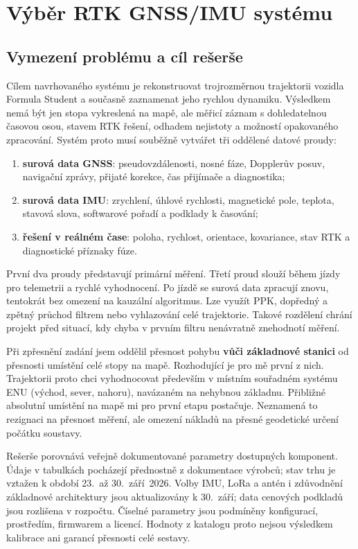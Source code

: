 \chapter{Výběr RTK GNSS/IMU systému}
\label{chap:vyber}

\section{Vymezení problému a cíl rešerše}

Cílem navrhovaného systému je rekonstruovat trojrozměrnou trajektorii vozidla
Formula Student a současně zaznamenat jeho rychlou dynamiku. Výsledkem nemá být
jen stopa vykreslená na mapě, ale měřicí záznam s dohledatelnou časovou osou,
stavem RTK řešení, odhadem nejistoty a možností opakovaného zpracování. Systém
proto musí souběžně vytvářet tři oddělené datové proudy:

\begin{enumerate}
  \item \textbf{surová data GNSS}: pseudovzdálenosti, nosné fáze, Dopplerův
        posuv, navigační zprávy, přijaté korekce, čas přijímače a diagnostika;
  \item \textbf{surová data IMU}: zrychlení, úhlové rychlosti, magnetické
        pole, teplota, stavová slova, softwarové pořadí a podklady k časování;
  \item \textbf{řešení v reálném čase}: poloha, rychlost, orientace,
        kovariance, stav RTK a diagnostické příznaky fúze.
\end{enumerate}

První dva proudy představují primární měření. Třetí proud slouží během jízdy
pro telemetrii a rychlé vyhodnocení. Po jízdě se surová data zpracují znovu,
tentokrát bez omezení na kauzální algoritmus. Lze využít PPK, dopředný a zpětný
průchod filtrem nebo vyhlazování celé trajektorie. Takové rozdělení chrání
projekt před situací, kdy chyba v prvním filtru nenávratně znehodnotí měření.

Při zpřesnění zadání jsem oddělil přesnost pohybu \textbf{vůči základnové
stanici} od přesnosti umístění celé stopy na mapě. Rozhodující je pro mě
první z nich. Trajektorii proto chci vyhodnocovat především v místním
souřadném systému ENU (východ, sever, nahoru), navázaném na nehybnou
základnu. Přibližné absolutní umístění na mapě mi pro první etapu postačuje.
Neznamená to rezignaci na přesnost měření, ale omezení nákladů na přesné
geodetické určení počátku soustavy.

Rešerše porovnává veřejně dokumentované parametry dostupných komponent. Údaje
v tabulkách pocházejí přednostně z dokumentace výrobců; stav trhu je vztažen k
období 23.~až 30.~září~2026. Volby IMU, LoRa a antén i zdůvodnění
základnové architektury jsou aktualizovány k 30.~září; data cenových
podkladů jsou rozlišena v rozpočtu. Číselné parametry jsou podmíněny konfigurací, prostředím,
firmwarem a licencí. Hodnoty z katalogu proto nejsou výsledkem kalibrace ani
garancí přesnosti celé sestavy.

